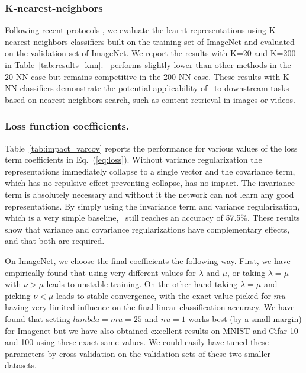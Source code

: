 \subsubsection{K-nearest-neighbors}

Following recent protocols \cite{caron2020swav, wu2018discrimination, zhuang2019local}, we evaluate the learnt representations using K-nearest-neighbors classifiers built on the training set of ImageNet and evaluated on the validation set of ImageNet. We report the results with K=20 and K=200 in Table~\ref{tab:results_knn}. \algo \ performs slightly lower than other methods in the 20-NN case but remains competitive in the 200-NN case. These results with K-NN classifiers demonstrate the potential applicability of \algo \ to downstream tasks based on nearest neighbors search, such as content retrieval in images or videos.

\subsubsection{Loss function coefficients.} \label{app:loss_coeffs}
Table~\ref{tab:impact_varcov} reports the performance for various values of the loss term coefficients in Eq.~(\ref{eq:loss}). Without variance regularization the representations immediately collapse to a single vector and the covariance term, which has no repulsive effect preventing collapse, has no impact. The invariance term is absolutely necessary and without it the network can not learn any good representations. By simply using the invariance term and variance regularization, which is a very simple baseline, \algo \ still reaches an accuracy of 57.5$\%$. These results show that variance and covariance regularizations have complementary effects, and that both are required.

On ImageNet, we choose the final coefficients the following way. First, we have empirically found that using very different values for $\lambda$ and $\mu$, or taking $\lambda=\mu$ with $\nu > \mu$ leads to unstable training. On the other hand taking $\lambda=\mu$ and picking $\nu<\mu$ leads to stable convergence, with the exact value picked for $mu$ having very limited influence on the final linear classification accuracy. We have found that setting $lambda=mu= 25$ and $nu=1$ works best (by a small margin) for Imagenet but we have also obtained excellent results on MNIST and Cifar-10 and 100 using these exact same values. We could easily have tuned these parameters by cross-validation on the validation sets of these two smaller datasets.

